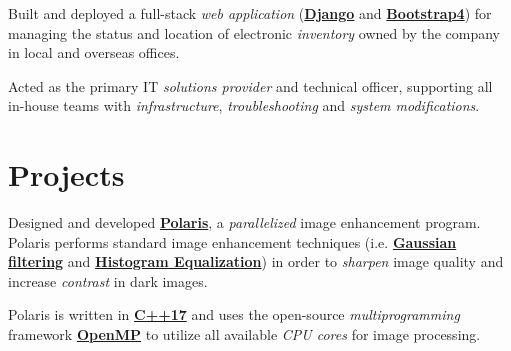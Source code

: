 \documentclass[]{openfont}
\begin{document}
\begin{minipage}[t]{0.65\textwidth}
    \begin{tightemize}
        \item Built and deployed a full-stack \textit{web application} (\href{https://www.djangoproject.com/}{\textbf{Django}} and \href{https://getbootstrap.com/}{\textbf{Bootstrap4}}) for managing the status and location of electronic \textit{inventory} owned by the company in local and overseas offices.
        \item Acted as the primary IT \textit{solutions provider} and technical officer, supporting all in-house teams with \textit{infrastructure}, \textit{troubleshooting} and \textit{system modifications}.
    \end{tightemize}
    \sectionsep


    \section{Projects}
    \begin{tightemize}
        \item Designed and developed \textbf{\href{https://github.com/OwaisK4/Parallel_Image_Enhancement}{Polaris}}, a \textit{parallelized} image enhancement program. Polaris performs standard image enhancement techniques (i.e. \href{https://en.wikipedia.org/wiki/Gaussian_filter}{\textbf{Gaussian filtering}} and \href{https://en.wikipedia.org/wiki/Histogram_equalization}{\textbf{Histogram Equalization}}) in order to \textit{sharpen} image quality and increase \textit{contrast} in dark images.\\

        \item Polaris is written in \textbf{\href{https://en.cppreference.com/w/cpp/17}{C++17}} and uses the open-source \textit{multiprogramming} framework \textbf{\href{https://www.openmp.org/}{OpenMP}} to utilize all available \textit{CPU cores} for image processing. \\
    \end{tightemize}
    \sectionsep


\end{minipage}
\end{document}
